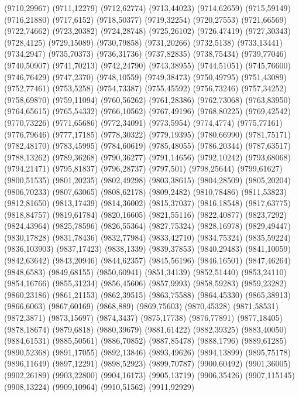 (9710,29967)
(9711,12279)
(9712,62774)
(9713,44023)
(9714,62659)
(9715,59149)
(9716,21880)
(9717,6152)
(9718,50377)
(9719,32254)
(9720,27553)
(9721,66569)
(9722,74662)
(9723,20382)
(9724,28748)
(9725,26102)
(9726,47419)
(9727,30343)
(9728,4125)
(9729,15089)
(9730,79858)
(9731,20266)
(9732,5138)
(9733,13441)
(9734,2947)
(9735,70373)
(9736,31736)
(9737,82835)
(9738,75434)
(9739,77046)
(9740,50907)
(9741,70213)
(9742,24790)
(9743,38955)
(9744,51051)
(9745,76600)
(9746,76429)
(9747,2370)
(9748,10559)
(9749,38473)
(9750,49795)
(9751,43089)
(9752,77461)
(9753,5258)
(9754,73387)
(9755,45592)
(9756,73246)
(9757,34252)
(9758,69870)
(9759,11094)
(9760,56262)
(9761,28386)
(9762,73068)
(9763,83950)
(9764,65615)
(9765,54332)
(9766,10562)
(9767,49196)
(9768,80225)
(9769,42542)
(9770,73226)
(9771,65686)
(9772,34091)
(9773,5954)
(9774,4774)
(9775,77161)
(9776,79646)
(9777,17185)
(9778,30322)
(9779,19395)
(9780,66990)
(9781,75171)
(9782,48170)
(9783,45995)
(9784,60619)
(9785,48055)
(9786,20344)
(9787,63517)
(9788,13262)
(9789,36268)
(9790,36277)
(9791,14656)
(9792,10242)
(9793,68068)
(9794,21471)
(9795,81837)
(9796,28737)
(9797,501)
(9798,25644)
(9799,61627)
(9800,51535)
(9801,20235)
(9802,49298)
(9803,38615)
(9804,28509)
(9805,20204)
(9806,70233)
(9807,63065)
(9808,62178)
(9809,2482)
(9810,78486)
(9811,53823)
(9812,81650)
(9813,17439)
(9814,36002)
(9815,37037)
(9816,18548)
(9817,63775)
(9818,84757)
(9819,61784)
(9820,16605)
(9821,55116)
(9822,40877)
(9823,7292)
(9824,43964)
(9825,78596)
(9826,55364)
(9827,75324)
(9828,16978)
(9829,49447)
(9830,17828)
(9831,78436)
(9832,77984)
(9833,42710)
(9834,75324)
(9835,59224)
(9836,103903)
(9837,17423)
(9838,1339)
(9839,37853)
(9840,29483)
(9841,10059)
(9842,63642)
(9843,20946)
(9844,62357)
(9845,56196)
(9846,16501)
(9847,46264)
(9848,6583)
(9849,68155)
(9850,60941)
(9851,34139)
(9852,51440)
(9853,24110)
(9854,16766)
(9855,31234)
(9856,45606)
(9857,9993)
(9858,59283)
(9859,23282)
(9860,23186)
(9861,21153)
(9862,39515)
(9863,75588)
(9864,45330)
(9865,38913)
(9866,6063)
(9867,60169)
(9868,889)
(9869,75603)
(9870,45328)
(9871,58531)
(9872,3871)
(9873,15697)
(9874,3437)
(9875,17738)
(9876,77891)
(9877,18405)
(9878,18674)
(9879,6818)
(9880,39679)
(9881,61422)
(9882,39325)
(9883,40050)
(9884,61531)
(9885,50561)
(9886,70852)
(9887,85478)
(9888,1796)
(9889,61285)
(9890,52368)
(9891,17055)
(9892,13846)
(9893,49626)
(9894,13899)
(9895,75178)
(9896,11649)
(9897,12291)
(9898,52923)
(9899,70787)
(9900,60492)
(9901,36005)
(9902,26189)
(9903,22800)
(9904,16173)
(9905,13719)
(9906,35426)
(9907,115145)
(9908,13224)
(9909,10964)
(9910,51562)
(9911,92929)

